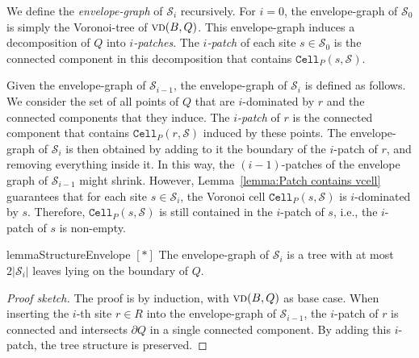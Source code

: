 \documentclass[a4paper,UKenglish]{socg-lipics-v2018}
\newcommand{\icell}[1][i]{${#1}$-patch\xspace}
\newcommand{\icells}[1][i]{${#1}$-patches\xspace}
\newcommand{\s}{\mathcal S}
\newcommand{\cell}[2][P]{\ensuremath{\mathtt{Cell}_{\scriptscriptstyle #1}(#2)}}
\newcommand{\vd}[2][P]{\textsc{vd}(#2, #1)}
\begin{document}
We define the \emph{envelope-graph} of $\s_i$ recursively. 
For $i = 0$, the envelope-graph of $\s_0$ is simply the Voronoi-tree of $\vd[Q]{B}$.
This envelope-graph induces a decomposition of $Q$ into \emph{\icells}.
The \emph{\icell} of each site $s\in \s_0$ is the connected component in this decomposition that contains $\cell{s, \s}$.

Given the envelope-graph of $\s_{i-1}$, the envelope-graph of $\s_i$ is defined as follows.
We consider the set of all points of $Q$ that are $i$-dominated by $r$ and the connected components that they induce. 
The \emph{\icell} of $r$ is the connected component that contains $\cell{r, \s}$ induced by these points.
The envelope-graph of $\s_i$ is then obtained by adding to it the boundary of the \icell of $r$, and removing everything inside it. 
In this way, the \icells[(i-1)] of the envelope graph of $\s_{i-1}$ might shrink. 
However, Lemma~\ref{lemma:Patch contains vcell} guarantees that for each site $s\in \s_i$, the Voronoi cell $\cell{s, \s}$ is $i$-dominated by $s$.
Therefore, $\cell{s, \s}$ is still contained in the \icell of $s$, i.e., the \icell of $s$ is non-empty.

\begin{restatable}{lemma}{StructureEnvelope}\label{lemma:Structure of the envelope}
\hyperref[ProofStructureEnvelope]{$[*]$}
The envelope-graph of $\s_i$ is a tree with at most $2|\s_i|$ leaves lying on the boundary of $Q$.
\end{restatable}
\begin{proof}[Proof sketch]
The proof is by induction, with $\vd[Q]{B}$ as base case. 
When inserting the $i$-th site $r\in R$ into the envelope-graph of $\s_{i-1}$, the \icell of $r$ is connected and intersects $\partial Q$ in a single connected component. By adding this \icell, the tree structure is preserved.
\end{proof}
\end{document}
